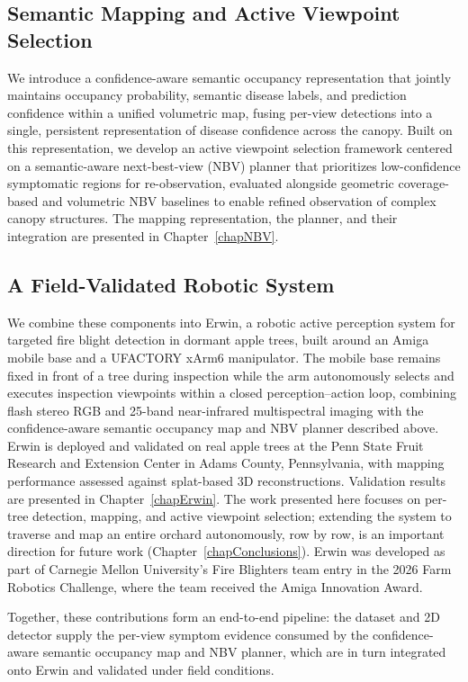 \subsection{Semantic Mapping and Active Viewpoint Selection}

We introduce a confidence-aware semantic occupancy representation that jointly
maintains occupancy probability, semantic disease labels, and prediction
confidence within a unified volumetric map, fusing per-view detections into a
single, persistent representation of disease confidence across the canopy.
Built on this representation, we develop an active viewpoint selection
framework centered on a semantic-aware next-best-view (NBV) planner that
prioritizes low-confidence symptomatic regions for re-observation, evaluated
alongside geometric coverage-based and volumetric NBV baselines to enable
refined observation of complex canopy structures.
The mapping representation, the planner, and their integration are presented
in Chapter~\ref{chapNBV}.

\subsection{A Field-Validated Robotic System}

We combine these components into Erwin, a robotic active perception system
for targeted fire blight detection in dormant apple trees, built around an
Amiga mobile base and a UFACTORY xArm6 manipulator.
The mobile base remains fixed in front of a tree during inspection while the
arm autonomously selects and executes inspection viewpoints within a closed
perception--action loop, combining flash stereo RGB and 25-band near-infrared
multispectral imaging with the confidence-aware semantic occupancy map and NBV
planner described above.
Erwin is deployed and validated on real apple trees at the Penn State Fruit
Research and Extension Center in Adams County, Pennsylvania, with mapping
performance assessed against splat-based 3D reconstructions.
Validation results are presented in Chapter~\ref{chapErwin}.
The work presented here focuses on per-tree detection, mapping, and active
viewpoint selection; extending the system to traverse and map an entire
orchard autonomously, row by row, is an important direction for future work
(Chapter~\ref{chapConclusions}).
Erwin was developed as part of Carnegie Mellon University's Fire Blighters
team entry in the 2026 Farm Robotics Challenge, where the team received the
Amiga Innovation Award.

Together, these contributions form an end-to-end pipeline: the dataset and 2D
detector supply the per-view symptom evidence consumed by the confidence-aware
semantic occupancy map and NBV planner, which are in turn integrated onto
Erwin and validated under field conditions.

